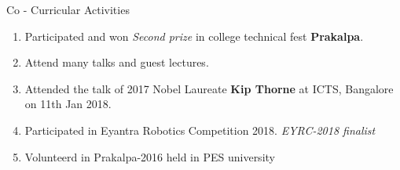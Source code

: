 \documentclass{resume} %
\begin{document}
\vspace{1cm}



\begin{rSection}{Co - Curricular Activities}
\begin{enumerate}
    \item Participated and won \textit{Second prize} in college technical fest {\bf Prakalpa}.
    \item Attend many talks and guest lectures.
    \item Attended the talk of 2017 Nobel Laureate {\bf Kip Thorne} at ICTS, Bangalore on 11th Jan 2018.
    \item Participated in Eyantra Robotics Competition 2018. \textit{EYRC-2018 finalist} 
    \item Volunteerd in Prakalpa-2016 held in PES university
\end{enumerate}
\end{rSection}

\vspace{1cm}
\end{document}
